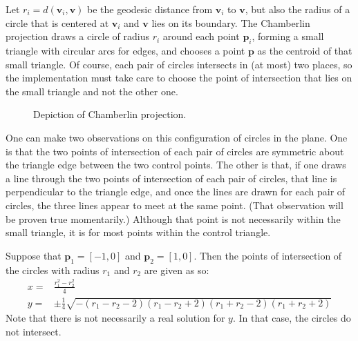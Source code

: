 \documentclass{amsart}[12pt]
\begin{document}
Let $r_i = d(\mathbf v_i, \mathbf v)$ be the geodesic distance from
$\mathbf v_i$ to $\mathbf v$, but also the radius of a circle that is centered
at $\mathbf v_i$ and $\mathbf v$ lies on its boundary. The Chamberlin
projection draws a circle of radius $r_i$ around each point $\mathbf p_i$,
forming a small triangle with circular arcs for edges, and chooses a point
$\mathbf p$ as the centroid of that small triangle. Of course, each pair of
circles intersects in (at most) two places, so the implementation must take
care to choose the point of intersection that lies on the small triangle and
not the other one.

\begin{figure}%
\caption{Depiction of Chamberlin projection.}
\label{fig:chamberlin}
\end{figure}

One can make two observations on this configuration of circles in the plane. One
is that the two points of intersection of each pair of circles are symmetric
about the triangle edge between the two control points. The other is that, if
one draws a line through the two points of intersection of each pair of circles,
that line is perpendicular to the triangle edge, and once the lines are drawn
for each pair of circles, the three lines appear to meet at the same point.
(That observation will be proven true momentarily.) Although that point is not
necessarily within the small triangle, it is for most points within the control
triangle.

Suppose that $\mathbf p_1 = [-1,0]$ and $\mathbf p_2 = [1,0]$. Then the points
of intersection of the circles with radius $r_1$ and $r_2$ are given as so:
\begin{equation}\begin{split}
x =& \frac{r^2_1 - r^2_2}{4}\\
y =& \pm \frac{1}{4} \sqrt{-
\left(r_1 - r_2 - 2\right)
\left(r_1 - r_2 + 2\right)
\left(r_1 + r_2 - 2\right)
\left(r_1 + r_2 + 2\right)}
\end{split}\end{equation}
Note that there is not necessarily a real solution for $y$. In that case, the
circles do not intersect.
\end{document}
